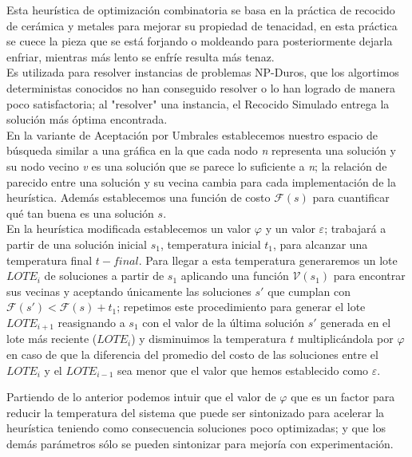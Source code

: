 \documentclass[a4paper]{article}
\begin{document}
Esta heurística de optimización combinatoria se basa en la práctica de recocido de cerámica y metales para mejorar su propiedad de tenacidad, en esta práctica se cuece la pieza que se está forjando o moldeando para posteriormente dejarla enfriar, mientras más lento se enfríe resulta más tenaz.\\ Es utilizada para resolver instancias de problemas NP-Duros, que los algortimos deterministas conocidos no han conseguido resolver o lo han logrado de manera poco satisfactoria; al "resolver" una instancia, el Recocido Simulado entrega la solución más óptima encontrada.
\\
En la variante de Aceptación por Umbrales establecemos nuestro espacio de búsqueda similar a una gráfica en la que cada nodo \textit{n} representa una solución y su nodo vecino \textit{v} es una solución que se parece lo suficiente a \textit{n}; la relación de parecido entre una solución y su vecina cambia para cada implementación de la heurística. Además establecemos una función de costo $\mathcal{F}(s)$ para cuantificar qué tan buena es una solución $s$.
\\
En la heurística modificada establecemos un valor $\varphi$ y un valor $\varepsilon$; trabajará a partir de una solución inicial $s_{1}$, temperatura inicial $t_{1}$, para alcanzar una temperatura final $t-final$. Para llegar a esta temperatura generaremos un lote $LOTE_{i}$ de soluciones a partir de $s_{1}$ aplicando una función $\mathcal{V}(s_{1})$ para encontrar sus vecinas y aceptando únicamente las soluciones $s'$ que cumplan con $\mathcal{F}(s') < \mathcal{F}(s) + t_{1}$; repetimos este procedimiento para generar el lote $LOTE_{i + 1}$ reasignando a $s_{1}$ con el valor de la última solución $s'$ generada en el lote más reciente ($LOTE_{i}$) y disminuimos la temperatura $t$ multiplicándola por $\varphi$ en caso de que la diferencia del promedio del costo de las soluciones entre el $LOTE_{i}$ y el $LOTE_{i - 1}$ sea menor que el valor que hemos establecido como $\varepsilon$.

Partiendo de lo anterior podemos intuir que el valor de $\varphi$ que es un factor para reducir la temperatura del sistema que puede ser sintonizado para acelerar la heurística teniendo como consecuencia soluciones poco optimizadas; y que los demás parámetros sólo se pueden sintonizar para mejoría con experimentación.
\end{document}
